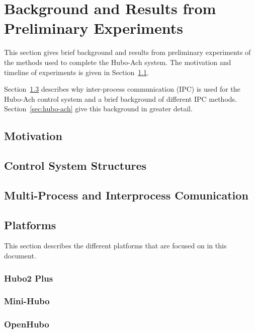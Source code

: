 \chapter{Background and Results from Preliminary Experiments}\label{sec:background}

This section gives brief background and results from preliminary experiments of the methods used to complete the Hubo-Ach system.
The motivation and timeline of experiments is given in Section~\ref{sec:roadmap}.

Section~\ref{sec:back:hubo-ach} describes why inter-process communication (IPC) is used for the Hubo-Ach control system and a brief background of different IPC methods.
Section~\ref{sec:hubo-ach} give this background in greater detail.


	\section{Motivation}\label{sec:roadmap}	
		
		

		\section{Control System Structures}\label{sec:back:struct}
				
		\section{Multi-Process and Interprocess Comunication}\label{sec:back:hubo-ach}
	    		
	    		
	    		
	\section{Platforms}\label{sec:robots}
	This section describes the different platforms that are focused on in this document.
		\subsection{Hubo2 Plus}\label{sec:hubo}
			
		\subsection{Mini-Hubo}\label{sec:mini-hubo}
			
		\subsection{OpenHubo}\label{sec:openhubo}
			
		
